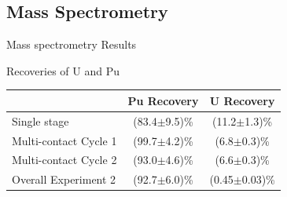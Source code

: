 \documentclass{beamer}
\begin{document}
\subsection{Mass Spectrometry}
\begin{frame}{Mass spectrometry Results}
  \begin{block}{Recoveries of U and Pu}
    \begin{center}
      \vskip -0.2cm
  \begin{tabular}{l  c  c}\toprule
                & Pu Recovery & U Recovery \\ \midrule \vspace{0.1cm}
   Single stage         & (83.4$\pm$9.5)\% & (11.2$\pm$1.3)\% \\
   Multi-contact Cycle 1 & (99.7$\pm$4.2)\% & (6.8$\pm$0.3)\% \\
   Multi-contact Cycle 2 & (93.0$\pm$4.6)\% & (6.6$\pm$0.3)\% \\
   Overall Experiment 2 & (92.7$\pm$6.0)\% & (0.45$\pm$0.03)\% \\ \bottomrule
  \end{tabular}
  \end{center}
  \end{block}
\end{frame}
\end{document}

